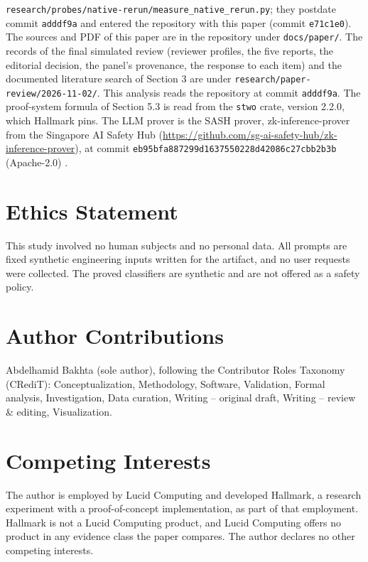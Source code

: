 \documentclass[11pt]{article}
\begin{document}
\texttt{research/\allowbreak{}probes/\allowbreak{}native-\allowbreak{}rerun/\allowbreak{}measure\_\allowbreak{}native\_\allowbreak{}rerun.\allowbreak{}py}; they postdate commit \texttt{adddf9a} and entered the repository with this paper (commit \texttt{e71c1e0}). The sources and PDF of this paper are in the repository under \texttt{docs/\allowbreak{}paper/\allowbreak{}}. The records of the final simulated review (reviewer profiles, the five reports, the editorial decision, the panel's provenance, the response to each item) and the documented literature search of Section 3 are under \texttt{research/\allowbreak{}paper-\allowbreak{}review/\allowbreak{}2026-\allowbreak{}11-\allowbreak{}02/\allowbreak{}}. This analysis reads the repository at commit \texttt{adddf9a}. The proof-system formula of Section 5.3 is read from the \texttt{stwo} crate, version 2.2.0, which Hallmark pins. The LLM prover is the SASH prover, zk-inference-prover from the Singapore AI Safety Hub (\url{https://github.com/sg-ai-safety-hub/zk-inference-prover}), at commit \texttt{eb95bfa8\allowbreak{}87299d16\allowbreak{}37550228\allowbreak{}d42086c2\allowbreak{}7cbb2b3b} (Apache-2.0) \cite{SASH}.

\section*{Ethics Statement}

This study involved no human subjects and no personal data. All prompts are fixed synthetic engineering inputs written for the artifact, and no user requests were collected. The proved classifiers are synthetic and are not offered as a safety policy.

\section*{Author Contributions}

Abdelhamid Bakhta (sole author), following the Contributor Roles Taxonomy (CRediT): Conceptualization, Methodology, Software, Validation, Formal analysis, Investigation, Data curation, Writing -- original draft, Writing -- review \& editing, Visualization.

\section*{Competing Interests}

The author is employed by Lucid Computing and developed Hallmark, a research experiment with a proof-of-concept implementation, as part of that employment. Hallmark is not a Lucid Computing product, and Lucid Computing offers no product in any evidence class the paper compares. The author declares no other competing interests.
\end{document}
